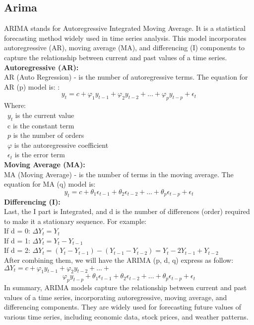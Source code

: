 \documentclass{ieeeojies}
\begin{document}
\subsection{Arima}
ARIMA stands for Autoregressive Integrated Moving Average. It is a statistical forecasting method widely used in time series analysis. This model incorporates autoregressive (AR), moving average (MA), and differencing (I) components to capture the relationship between current and past values of a time series. \\
\textbf{Autoregressive (AR):} \\
AR (Auto Regression) - is the number of autoregressive terms. The equation for AR (p) model is: :
\begin{equation}
y_t = c + {\varphi_1}y_{t-1} + {\varphi_2}y_{t-2} + ... +  {\varphi_p}y_{t-p} + \epsilon_t
\end{equation} 
Where:\\
\textbullet \ ${y_t}$ is the current value\\
\textbullet \ c is the constant term\\
\textbullet \ $p$ is the number of orders\\
\textbullet \ ${\varphi}$ is the autoregressive coefficient\\
\textbullet \ ${\epsilon_t}$ is the error term\\
\textbf{Moving Average (MA): }\\
MA (Moving Average) - is the number of terms in the moving average. The equation for MA (q) model is: 
\begin{equation}
y_t = c + {\theta_1}\epsilon_{t-1} + {\theta_2}\epsilon_{t-2} + ... +  {\theta_p}\epsilon_{t-p} + \epsilon_t
\end{equation} 
\textbf{Differencing (I): }\\
Last, the I part is Integrated, and d is the number of differences (order) required to make it a stationary sequence. For example:\\
If d = 0: ${\Delta Y_t} = Y_t$ \\
If d = 1: ${\Delta Y_t} = Y_t - Y_{t-1}$ \\
If d = 2: ${\Delta Y_t} = (Y_t - Y_{t-1}) - (Y_{t-1} - Y_{t-2}) =  Y_t - 2Y_{t-1} + Y_{t-2}$ \\
After combining them, we will have the ARIMA (p, d, q) express as follow:\\
$\Delta Y_t = c + {\varphi_1}y_{t-1} + {\varphi_2}y_{t-2} + ... +$
\begin{equation}
  {\varphi_p}y_{t-p} + {\theta_1}\epsilon_{t-1} + {\theta_2}\epsilon_{t-2} + ... +  {\theta_p}\epsilon_{t-p} + \epsilon_t
\end{equation} 
In summary, ARIMA models capture the relationship between current and past values of a time series, incorporating autoregressive, moving average, and differencing components. They are widely used for forecasting future values of various time series, including economic data, stock prices, and weather patterns.
\end{document}
